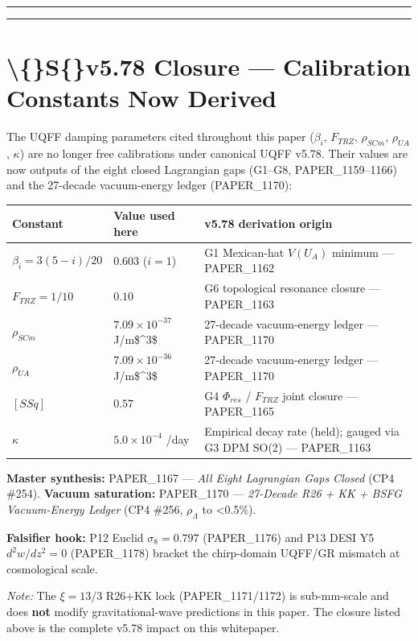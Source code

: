 \documentclass[11pt]{article}
\begin{document}
\noindent\rule{\textwidth}{0.4pt}

\noindent\rule{\textwidth}{0.4pt}

\section*{\textbackslash\{\}S\{\}v5.78 Closure --- Calibration Constants Now Derived}

The UQFF damping parameters cited throughout this paper ($\beta_i$, $F_{TRZ}$, $\rho_{SCm}$, $\rho_{UA}$, $\kappa$) are no longer free calibrations under canonical UQFF v5.78. Their values are now outputs of the eight closed Lagrangian gaps (G1--G8, PAPER\_1159--1166) and the 27-decade vacuum-energy ledger (PAPER\_1170):

\begin{center}
\begin{longtable}{lll}
\toprule
Constant & Value used here & v5.78 derivation origin \tabularnewline
\midrule
\endhead
$\beta_i = 3(5-i)/20$ & $0.603$ ($i=1$) & G1 Mexican-hat $V(U_A)$ minimum --- PAPER\_1162 \tabularnewline
$F_{TRZ} = 1/10$ & $0.10$ & G6 topological resonance closure --- PAPER\_1163 \tabularnewline
$\rho_{SCm}$ & $7.09\times10^{-37}$ J/m\$\textasciicircum{}3\$ & 27-decade vacuum-energy ledger --- PAPER\_1170 \tabularnewline
$\rho_{UA}$ & $7.09\times10^{-36}$ J/m\$\textasciicircum{}3\$ & 27-decade vacuum-energy ledger --- PAPER\_1170 \tabularnewline
$[SSq]$ & $0.57$ & G4 $\Phi_{res}$ / $F_{TRZ}$ joint closure --- PAPER\_1165 \tabularnewline
$\kappa$ & $5.0\times10^{-4}$ /day & Empirical decay rate (held); gauged via G3 DPM SO(2) --- PAPER\_1163 \tabularnewline
\bottomrule
\end{longtable}
\end{center}

\textbf{Master synthesis:} PAPER\_1167 --- \emph{All Eight Lagrangian Gaps Closed} (CP4 \#254). \textbf{Vacuum saturation:} PAPER\_1170 --- \emph{27-Decade R26 + KK + BSFG Vacuum-Energy Ledger} (CP4 \#256, $\rho_\Lambda$ to <0.5\%).

\textbf{Falsifier hook:} P12 Euclid $\sigma_8=0.797$ (PAPER\_1176) and P13 DESI Y5 $d^2 w/dz^2=0$ (PAPER\_1178) bracket the chirp-domain UQFF/GR mismatch at cosmological scale.

\emph{Note:} The $\xi=13/3$ R26+KK lock (PAPER\_1171/1172) is sub-mm-scale and does \textbf{not} modify gravitational-wave predictions in this paper. The closure listed above is the complete v5.78 impact on this whitepaper.
\end{document}

